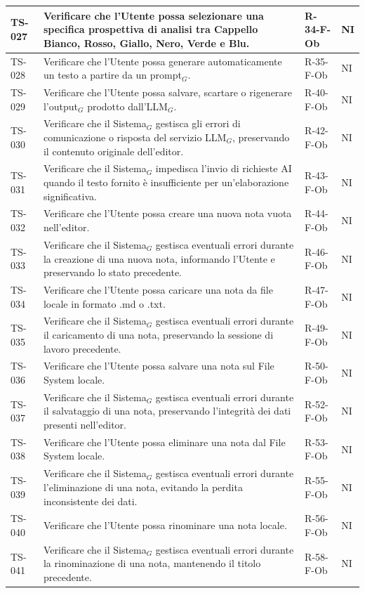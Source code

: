 \documentclass[a4paper, 10pt, colorlinks=true, linkcolor=black, urlcolor=blue, citecolor=blue, hidelinks]{article}
\begin{document}
\begin{longtable}{|p{1.4cm}|p{7.8cm}|p{2.3cm}|p{1.2cm}|}
    \hline
    TS-027 & Verificare che l'Utente possa selezionare una specifica prospettiva di analisi tra Cappello Bianco, Rosso, Giallo, Nero, Verde e Blu. & R-34-F-Ob & NI \\
    \hline
    TS-028 & Verificare che l'Utente possa generare automaticamente un testo a partire da un prompt$_G$. & R-35-F-Ob & NI \\
    \hline
    TS-029 & Verificare che l'Utente possa salvare, scartare o rigenerare l'output$_G$ prodotto dall'LLM$_G$. & R-40-F-Ob & NI \\
    \hline
    TS-030 & Verificare che il Sistema$_G$ gestisca gli errori di comunicazione o risposta del servizio LLM$_G$, preservando il contenuto originale dell'editor. & R-42-F-Ob & NI \\
    \hline
    TS-031 & Verificare che il Sistema$_G$ impedisca l'invio di richieste AI quando il testo fornito è insufficiente per un'elaborazione significativa. & R-43-F-Ob & NI \\
    \hline
    TS-032 & Verificare che l'Utente possa creare una nuova nota vuota nell'editor. & R-44-F-Ob & NI \\
    \hline
    TS-033 & Verificare che il Sistema$_G$ gestisca eventuali errori durante la creazione di una nuova nota, informando l'Utente e preservando lo stato precedente. & R-46-F-Ob & NI \\
    \hline
    TS-034 & Verificare che l'Utente possa caricare una nota da file locale in formato .md o .txt. & R-47-F-Ob & NI \\
    \hline
    TS-035 & Verificare che il Sistema$_G$ gestisca eventuali errori durante il caricamento di una nota, preservando la sessione di lavoro precedente. & R-49-F-Ob & NI \\
    \hline
    TS-036 & Verificare che l'Utente possa salvare una nota sul File System locale. & R-50-F-Ob & NI \\
    \hline
    TS-037 & Verificare che il Sistema$_G$ gestisca eventuali errori durante il salvataggio di una nota, preservando l'integrità dei dati presenti nell'editor. & R-52-F-Ob & NI \\
    \hline
    TS-038 & Verificare che l'Utente possa eliminare una nota dal File System locale. & R-53-F-Ob & NI \\
    \hline
    TS-039 & Verificare che il Sistema$_G$ gestisca eventuali errori durante l'eliminazione di una nota, evitando la perdita inconsistente dei dati. & R-55-F-Ob & NI \\
    \hline
    TS-040 & Verificare che l'Utente possa rinominare una nota locale. & R-56-F-Ob & NI \\
    \hline
    TS-041 & Verificare che il Sistema$_G$ gestisca eventuali errori durante la rinominazione di una nota, mantenendo il titolo precedente. & R-58-F-Ob & NI \\
    \hline


\end{longtable}
\end{document}

